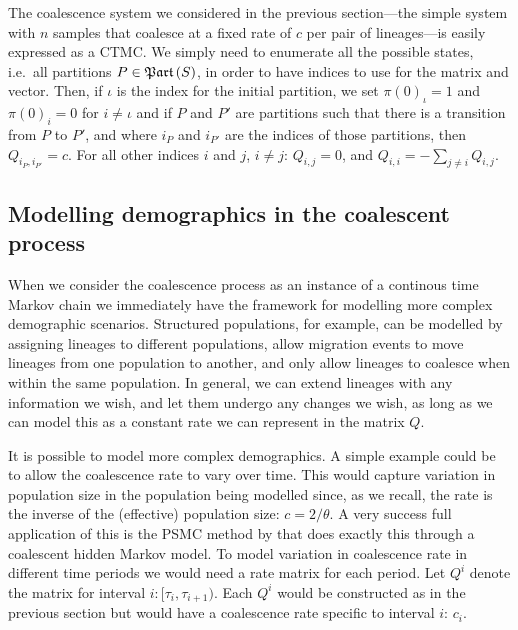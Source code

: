 The coalescence system we considered in the previous section---the simple system with $n$ samples that coalesce at a fixed rate of $c$ per pair of lineages---is easily expressed as a CTMC. We simply need to enumerate all the possible states, i.e.\ all partitions $P\in\mathfrak{Part}\left(S\right)$, in order to have indices to use for the matrix and vector. Then, if $\iota$ is the index for the initial partition, we set $\pi(0)_\iota=1$ and $\pi(0)_i=0$ for $i\neq\iota$ and if $P$ and $P'$ are partitions such that there is a transition from $P$ to $P'$, and where $i_P$ and $i_{P'}$ are the indices of those partitions, then $Q_{i_P,i_{P'}}=c$. For all other indices $i$ and $j$, $i\neq j$: $Q_{i,j}=0$, and $Q_{i,i}=-\sum_{j\neq i} Q_{i,j}$.


\subsection{Modelling demographics in the coalescent process}

When we consider the coalescence process as an instance of a continous time Markov chain we immediately have the framework for modelling more complex demographic scenarios. Structured populations, for example, can be modelled by assigning lineages to different populations, allow migration events to move lineages from one population to another, and only allow lineages to coalesce when within the same population. In general, we can extend lineages with any information we wish, and let them undergo any changes we wish, as long as we can model this as a constant rate we can represent in the matrix $Q$.

It is possible to model more complex demographics. A simple example could be to allow the coalescence rate to vary over time. This would capture variation in population size in the population being modelled since, as we recall, the rate is the inverse of the (effective) population size: $c=2/\theta$. A very success full application of this is the PSMC method by \citet{Li:2011ez} that does exactly this through a coalescent hidden Markov model. To model variation in coalescence rate in different time periods we would need a rate matrix for each period. Let $Q^i$ denote the matrix for interval $i: [\tau_i,\tau_{i+1})$. Each $Q^i$ would be constructed as in the previous section but would have a coalescence rate specific to interval $i$: $c_i$.

